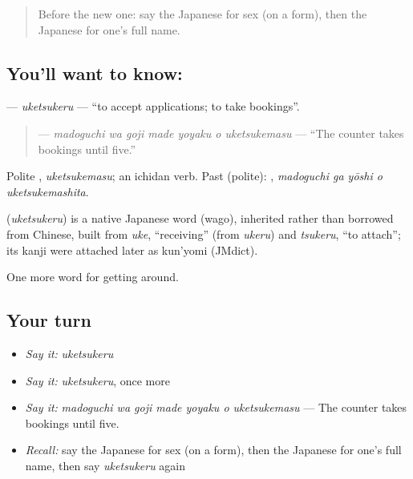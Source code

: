\label{lesson:JA-C419-uketsukeru}



\begin{quote}
Before the new one: say the Japanese for sex (on a form), then the Japanese for one's full name.
\end{quote}

\subsection*{You'll want to know: }
\textbf{} — \emph{uketsukeru} — \textquotedblleft{}to accept applications; to take bookings\textquotedblright{}.

\begin{quote}
\textbf{   } — \emph{madoguchi wa goji made yoyaku o uketsukemasu} — \textquotedblleft{}The counter takes bookings until five.\textquotedblright{}
\end{quote}

Polite \textbf{}, \emph{uketsukemasu}; an ichidan verb. Past (polite): \textbf{  }, \emph{madoguchi ga yōshi o uketsukemashita}.

\begin{cousinweb}
\textbf{} (\emph{uketsukeru}) is a native Japanese word (wago), inherited rather than borrowed from Chinese, built from \emph{uke}, \textquotedblleft{}receiving\textquotedblright{} (from \emph{ukeru}) and \emph{tsukeru}, \textquotedblleft{}to attach\textquotedblright{}; its kanji were attached later as kun'yomi (JMdict).
\end{cousinweb}

\begin{grammarlens}[title={What you've built}]
One more word for getting around.
\end{grammarlens}

\subsection*{Your turn}
\begin{itemize}
\raggedright
  \item \emph{Say it:} \emph{uketsukeru}
  \item \emph{Say it:} \emph{uketsukeru}, once more
  \item \emph{Say it:} \emph{madoguchi wa goji made yoyaku o uketsukemasu} — The counter takes bookings until five.
  \item \emph{Recall:} say the Japanese for sex (on a form), then the Japanese for one's full name, then say \emph{uketsukeru} again
\end{itemize}

